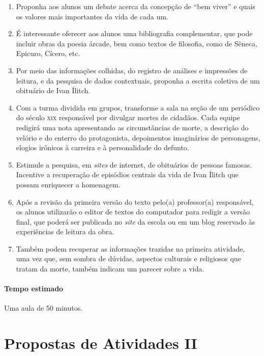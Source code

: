 \documentclass[12pt]{extarticle}
\begin{document}
\begin{enumerate}

\item Proponha aos alunos um debate acerca da concepção
de ``bem viver'' e quais os valores mais importantes da vida de cada um.

\item É interessante oferecer
aos alunos uma bibliografia complementar, que pode incluir obras da
poesia árcade, bem como textos de filosofia, como de Sêneca, Epicuro,
Cícero, etc.

\item Por meio das informações colhidas, do
registro de análises e impressões de leitura, e da pesquisa de dados
contextuais, proponha a escrita coletiva de um obituário de
Ivan Ílitch.

\item Com a turma dividida em grupos, transforme a sala na
seção de um periódico do século \textsc{xix} responsável por divulgar mortes de
cidadãos. Cada equipe redigirá uma nota apresentando as circunstâncias
de morte, a descrição do velório e do enterro do protagonista,
depoimentos imaginários de personagens, elogios irônicos à carreira e
à personalidade do defunto. 

\item Estimule a pesquisa, em \emph{sites} de
internet, de obituários de pessoas famosas. Incentive a
recuperação de episódios centrais da vida de Ivan Ílitch que possam
enriquecer a homenagem. 

\item Após a revisão da primeira versão do texto
pelo(a) professor(a) responsável, os alunos utilizarão o editor de
textos do computador para redigir a versão final, que poderá ser
publicada no \emph{site} da escola ou em um blog reservado às
experiências de leitura da obra.

\item Também podem recuperar as informações trazidas na
primeira atividade, uma vez que, sem sombra de dúvidas, aspectos
culturais e religiosos que tratam da morte, também indicam um parecer
sobre a vida.

\end{enumerate}

\paragraph{Tempo estimado} Uma aula de 50 minutos.

\section{Propostas de Atividades II}
\end{document}
